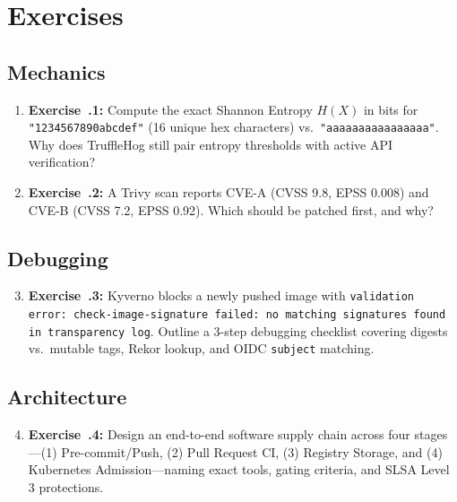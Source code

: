 \section{Exercises}

\subsection{Mechanics}
\begin{enumerate}[leftmargin=18pt]
  \item \textbf{Exercise~\thechapter.1:} Compute the exact Shannon Entropy $H(X)$ in bits for \texttt{"1234567890abcdef"} (16 unique hex characters) vs.\ \texttt{"aaaaaaaaaaaaaaaa"}. Why does TruffleHog still pair entropy thresholds with active API verification?
  \item \textbf{Exercise~\thechapter.2:} A Trivy scan reports CVE-A (CVSS 9.8, EPSS 0.008) and CVE-B (CVSS 7.2, EPSS 0.92). Which should be patched first, and why?
\end{enumerate}

\subsection{Debugging}
\begin{enumerate}[leftmargin=18pt]
  \setcounter{enumi}{2}
  \item \textbf{Exercise~\thechapter.3:} Kyverno blocks a newly pushed image with \texttt{validation error: check-image-signature failed: no matching signatures found in transparency log}. Outline a 3-step debugging checklist covering digests vs.\ mutable tags, Rekor lookup, and OIDC \texttt{subject} matching.
\end{enumerate}

\subsection{Architecture}
\begin{enumerate}[leftmargin=18pt]
  \setcounter{enumi}{3}
  \item \textbf{Exercise~\thechapter.4:} Design an end-to-end software supply chain across four stages—(1) Pre-commit/Push, (2) Pull Request CI, (3) Registry Storage, and (4) Kubernetes Admission—naming exact tools, gating criteria, and SLSA Level 3 protections.
\end{enumerate}

